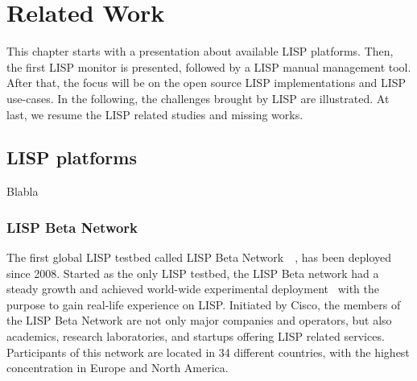 
\chapter{Related Work}
\label{cha:related_work}

\ifpdf
    \graphicspath{{Chapter3/Pics/Raster/}{Chapter3/Pics/PDF/}{Chapter3/}}
\else
    \graphicspath{{Chapter3/Pics/Vector/}{Chapter3/}}
\fi
This chapter starts with a presentation about available LISP platforms. Then, the first LISP monitor is presented, followed by a LISP manual management tool. After that, the focus will be on the open source LISP implementations and LISP use-cases. In the following, the challenges brought by LISP are illustrated. At last, we resume the LISP related studies and missing works.


\section{LISP platforms}
\label{sec:platform}
Blabla 

\subsection{LISP Beta Network}
\label{subsec:platform_beta}

The first global LISP testbed called LISP Beta Network~\cite{lispbeta}~\cite{coras2014performance}, has been deployed since 2008. Started as the only LISP testbed, the LISP Beta network had a steady growth and achieved world-wide experimental deployment~\cite{lispCCR} with the purpose to gain real-life experience on LISP. Initiated by Cisco, the members of the LISP Beta Network are not only major companies and operators, but also academics, research laboratories, and startups offering LISP related services. Participants of this network are located in 34 different countries, with the highest concentration in Europe and North America.

